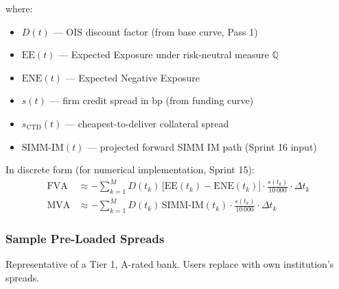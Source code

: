 \documentclass[11pt, a4paper]{article}
\begin{document}
where:
\begin{itemize}[leftmargin=1.5cm]
  \item $D(t)$ — OIS discount factor (from base curve, Pass 1)
  \item $\mathrm{EE}(t)$ — Expected Exposure under risk-neutral measure $\mathbb{Q}$
  \item $\mathrm{ENE}(t)$ — Expected Negative Exposure
  \item $s(t)$ — firm credit spread in bp (from funding curve)
  \item $s_{\mathrm{CTD}}(t)$ — cheapest-to-deliver collateral spread
  \item $\mathrm{SIMM\text{-}IM}(t)$ — projected forward SIMM IM path (Sprint 16 input)
\end{itemize}

In discrete form (for numerical implementation, Sprint 15):
\begin{align}
  \mathrm{FVA} &\approx -\sum_{k=1}^{M} D(t_k)\,
    \bigl[\mathrm{EE}(t_k) - \mathrm{ENE}(t_k)\bigr]\cdot
    \frac{s(t_k)}{10\,000}\cdot\Delta t_k \\[4pt]
  \mathrm{MVA} &\approx -\sum_{k=1}^{M} D(t_k)\,
    \mathrm{SIMM\text{-}IM}(t_k)\cdot
    \frac{s(t_k)}{10\,000}\cdot\Delta t_k
\end{align}

\subsubsection{Sample Pre-Loaded Spreads}

Representative of a Tier 1, A-rated bank. Users replace with own institution's spreads.
\end{document}
